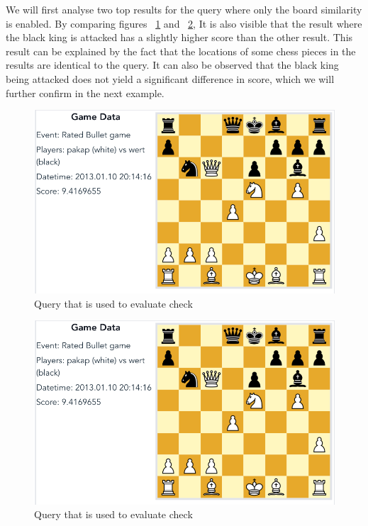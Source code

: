 \documentclass[11pt]{article}
\begin{document}
    We will first analyse two top results for the query where only the board similarity is enabled. By comparing figures ~\ref{fig:BlackCheck1-Bo} and ~\ref{fig:BlackCheck2-Bo}, It is also visible that the result where the black king is attacked has a slightly higher score than the other result. This result can be explained by the fact that the locations of some chess pieces in the results are identical to the query. It can also be observed that the black king being attacked does not yield a significant difference in score, which we will further confirm in the next example.

    \begin{figure}[H]
        \centering
        \includegraphics[width=14cm]{images/BlackCheck1-Bo}
        \caption{Query that is used to evaluate check}
        \label{fig:BlackCheck1-Bo}
    \end{figure}

    \begin{figure}[H]
        \centering
        \includegraphics[width=14cm]{images/BlackCheck1-Bo}
        \caption{Query that is used to evaluate check}
        \label{fig:BlackCheck2-Bo}
    \end{figure}
\end{document}

